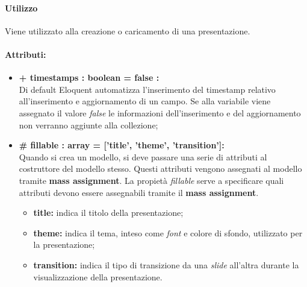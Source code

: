 	\paragraph{Utilizzo}
	Viene utilizzato alla creazione o caricamento di una presentazione.
	
	\paragraph{Attributi:}
	\begin{itemize}
		\item \textbf{+ timestamps : boolean = false :}\\
		Di default Eloquent automatizza l'inserimento del timestamp relativo all'inserimento e aggiornamento di un campo. Se alla variabile viene assegnato il valore \textit{false} le informazioni dell'inserimento e del aggiornamento non verranno aggiunte alla collezione;
		\item \textbf{\# fillable : array = ['title', 'theme', 'transition']:}\\
		Quando si crea un modello, si deve passare una serie di attributi al costruttore del modello stesso. Questi attributi vengono assegnati al modello tramite \textbf{mass assignment}. La propietà \textit{fillable} serve a specificare quali attributi devono essere assegnabili tramite il \textbf{mass assignment}.
		\begin{itemize}
			\item \textbf{title:} indica il titolo della presentazione;
			\item \textbf{theme:} indica il tema, inteso come \textit{\gls{font}} e colore di sfondo, utilizzato per la presentazione;
			\item \textbf{transition:} indica il tipo di transizione da una \textit{\gls{slide}} all'altra durante la visualizzazione della presentazione.
		\end{itemize}
	\end{itemize}

